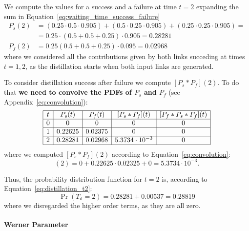 \documentclass{masterthesis}
\begin{document}
We compute the values for a success and a failure at time $t=2$ expanding the sum in Equation~\ref{eq:waiting_time_success_failure}
\begin{align}
    P_s(2) &= \left(0.25 \cdot 0.5 \cdot 0.905\right) + \left(0.5 \cdot 0.25 \cdot 0.905\right) + \left(0.25 \cdot 0.25 \cdot 0.905\right) = \\
           &= 0.25 \cdot \left(0.5 + 0.5 + 0.25 \right) \cdot 0.905 = 0.28281 \\
    P_f(2) &= 0.25 \left(0.5 + 0.5 + 0.25\right) \cdot 0.095 = 0.02968
\end{align}
where we considered all the contributions given by both links succeding at times $t={1,2}$, as the distillation starts when both input links are generated.

To consider distillation success after failure we compute $[P_s \ast P_f](2)$. To do that \textbf{we need to convolve the PDFs of $P_s$ and $P_f$} (see Appendix~\ref{eq:convolution}):
\begin{equation*}
    \begin{array}{|c|c|c|c|c|}
        \hline
        t & P_s(t) & P_f(t) & [P_s \ast P_f](t) & [P_f \ast P_s \ast P_f](t) \\
        \hline
        0 & 0 & 0 & 0 & 0 \\
        \hline
        1 & 0.22625 & 0.02375 & 0 & 0 \\
        \hline
        2 & 0.28281 & 0.02968 & 5.3734 \cdot 10^{-3} & 0 \\
        \hline
    \end{array}
\end{equation*}
where we computed $[P_s \ast P_f](2)$ according to Equation~\ref{eq:convolution}:
\begin{equation}
    [P_s * P_f](2) = 0 + 0.22625 \cdot 0.02325 + 0 = 5.3734 \cdot 10^{-3} .
\end{equation}

Thus, the probability distribution function for $t = 2$ is, according to Equation~\ref{eq:distillation_t2}:
\begin{equation}
    \Pr(T_{\text{d}} = 2) = 0.28281 + 0.00537 = 0.28819
\end{equation}
where we disregarded the higher order terms, as they are all zero.

\paragraph*{Werner Parameter}
\end{document}
